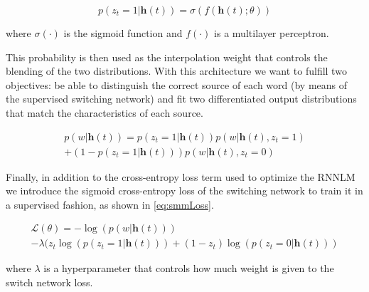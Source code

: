 \begin{equation} \label{eq:probSwitch}
	p(z_t=1|\mathbf{h}(t)) = \sigma(f(\mathbf{h}(t);\theta))
\end{equation}

where $\sigma(\cdot)$ is the sigmoid function and $f(\cdot)$ is a multilayer perceptron.

This probability is then used as the interpolation weight that controls the blending of the two distributions. With this architecture we want to fulfill two objectives: be able to distinguish the correct source of each word (by means of the supervised switching network) and fit two differentiated output distributions that match the characteristics of each source. 

\begin{equation} \label{eq:smm}
	\begin{gathered}
		p(w|\mathbf{h}(t)) = p(z_t=1|\mathbf{h}(t))p(w|\mathbf{h}(t), z_t=1) \\
		+ (1-p(z_t=1|\mathbf{h}(t)))p(w|\mathbf{h}(t), z_t=0)
	\end{gathered}
\end{equation}

Finally, in addition to the cross-entropy loss term used to optimize the RNNLM we introduce the sigmoid cross-entropy loss of the switching network to train it in a supervised fashion, as shown in \autoref{eq:smmLoss}.

\begin{equation} \label{eq:smmLoss}
	\begin{gathered}
		\mathcal{L}(\theta) = -\log(p(w|\mathbf{h}(t))) \\
		- \lambda(z_t\log(p(z_t=1|\mathbf{h}(t))) + (1 - z_t)\log(p(z_t=0|\mathbf{h}(t)))
	\end{gathered}
\end{equation}

where $\lambda$ is a hyperparameter that controls how much weight is given to the switch network loss.
